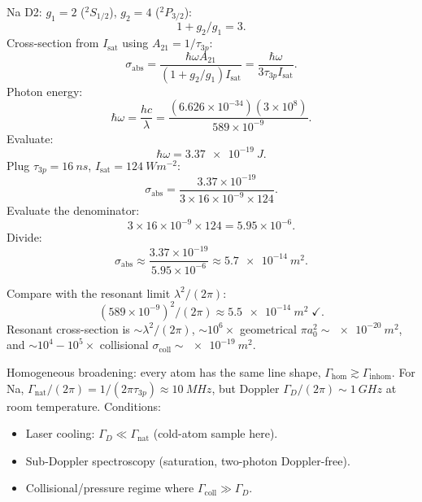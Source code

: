 \documentclass[11pt]{article}
\begin{document}
Na D2: $g_1=2$ (${}^2S_{1/2}$), $g_2=4$ (${}^2P_{3/2}$):
\[ 1+g_2/g_1=3. \]
Cross-section from $I_\text{sat}$ using $A_{21}=1/\tau_{3p}$:
\[ \sigma_\text{abs}=\frac{\hbar\omega A_{21}}{(1+g_2/g_1)I_\text{sat}}=\frac{\hbar\omega}{3\tau_{3p}I_\text{sat}}. \]
Photon energy:
\[ \hbar\omega=\frac{hc}{\lambda}=\frac{(6.626\times 10^{-34})(3\times 10^8)}{589\times 10^{-9}}. \]
Evaluate:
\[ \hbar\omega=\SI{3.37e-19}{J}. \]
Plug $\tau_{3p}=\SI{16}{ns}$, $I_\text{sat}=\SI{124}{W m^{-2}}$:
\[ \sigma_\text{abs}=\frac{3.37\times 10^{-19}}{3\times 16\times 10^{-9}\times 124}. \]
Evaluate the denominator:
\[ 3\times 16\times 10^{-9}\times 124=5.95\times 10^{-6}. \]
Divide:
\[ \boxed{\;\sigma_\text{abs}\approx \frac{3.37\times 10^{-19}}{5.95\times 10^{-6}}\approx \SI{5.7e-14}{m^2}.\;} \]

Compare with the resonant limit $\lambda^2/(2\pi)$:
\[ (589\times 10^{-9})^2/(2\pi)\approx \SI{5.5e-14}{m^2}\;\checkmark. \]
Resonant cross-section is $\sim\lambda^2/(2\pi)$, $\sim 10^6\times$ geometrical $\pi a_0^2\sim\SI{e-20}{m^2}$, and $\sim 10^4\!-\!10^5\times$ collisional $\sigma_\text{coll}\sim\SI{e-19}{m^2}$.

Homogeneous broadening: every atom has the same line shape, $\Gamma_\text{hom}\gtrsim\Gamma_\text{inhom}$. For Na, $\Gamma_\text{nat}/(2\pi)=1/(2\pi\tau_{3p})\approx \SI{10}{MHz}$, but Doppler $\Gamma_D/(2\pi)\sim\SI{1}{GHz}$ at room temperature. Conditions:
\begin{itemize}
\item Laser cooling: $\Gamma_D\ll\Gamma_\text{nat}$ (cold-atom sample here).
\item Sub-Doppler spectroscopy (saturation, two-photon Doppler-free).
\item Collisional/pressure regime where $\Gamma_\text{coll}\gg\Gamma_D$.
\end{itemize}
\end{document}
